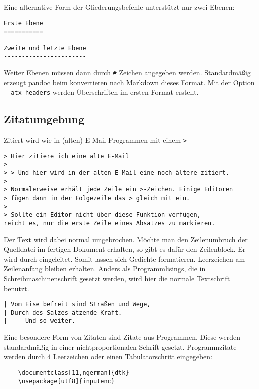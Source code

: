 \documentclass[11pt,ngerman,a4paper]{article}
\begin{document}
Eine alternative Form der Gliederungsbefehle unterstützt nur zwei
Ebenen:

\begin{verbatim}
Erste Ebene
===========

Zweite und letzte Ebene
-----------------------
\end{verbatim}

Weiter Ebenen müssen dann durch \texttt{\#} Zeichen angegeben werden.
Standardmäßig erzeugt pandoc beim konvertieren nach Markdown dieses
Format. Mit der Option \texttt{-{}-atx-headers} werden Überschriften im
ersten Format erstellt.

\subsection{Zitatumgebung}

Zitiert wird wie in (alten) E-Mail Programmen mit einem
\texttt{\textgreater{}}

\begin{verbatim}
> Hier zitiere ich eine alte E-Mail
>
> > Und hier wird in der alten E-Mail eine noch ältere zitiert.
>
> Normalerweise erhält jede Zeile ein >-Zeichen. Einige Editoren
> fügen dann in der Folgezeile das > gleich mit ein.
>
> Sollte ein Editor nicht über diese Funktion verfügen,
reicht es, nur die erste Zeile eines Absatzes zu markieren.
\end{verbatim}

Der Text wird dabei normal umgebrochen. Möchte man den Zeilenumbruch der
Quelldatei im fertigen Dokument erhalten, so gibt es dafür den
Zeilenblock. Er wird durch \texttt{\textbar{}} eingeleitet. Somit lassen
sich Gedichte formatieren. Leerzeichen am Zeilenanfang bleiben erhalten.
Anders als Programmlisings, die in Schreibmaschinenschrift gesetzt
werden, wird hier die normale Textschrift benutzt.

\begin{verbatim}
| Vom Eise befreit sind Straßen und Wege,
| Durch des Salzes ätzende Kraft.
|     Und so weiter.
\end{verbatim}

Eine besondere Form von Zitaten sind Zitate aus Programmen. Diese werden
standardmäßig in einer nichtproportionalen Schrift gesetzt.
Programmzitate werden durch 4 Leerzeichen oder einen Tabulatorschritt
eingegeben:

\begin{verbatim}
    \documentclass[11,ngerman]{dtk}
    \usepackage[utf8]{inputenc}
\end{verbatim}
\end{document}
